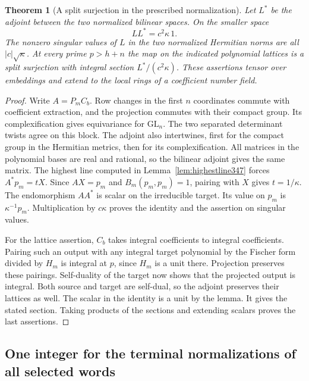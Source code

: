\documentclass[a4paper,11pt]{article}
\newtheorem{theorem}[proposition]{Theorem}
\theoremstyle{definition}
\theoremstyle{remark}
\numberwithin{equation}{section}
\begin{document}
\begin{theorem}[A split surjection in the prescribed normalization]\leavevmode
\label{thm:lowerlattice347}
Let \(L^*\) be the adjoint between the two normalized bilinear
spaces. On the smaller space
\[
                 LL^*=c^2\kappa\,1 .
\]
The nonzero singular values of \(L\) in the two normalized
Hermitian norms are all \(|c|\sqrt{\kappa}\).
At every prime \(p>h+n\) the map on the indicated polynomial
lattices is a split surjection with integral section
\(L^*/(c^2\kappa)\). These assertions tensor over embeddings
and extend to the local rings of a coefficient number field.
\end{theorem}
\begin{proof}
Write \(A=P_m C_b\). Row changes in the first \(n\) coordinates
commute with coefficient extraction, and the projection commutes
with their compact group. Its complexification gives equivariance
for \(\mathrm{GL}_n\). The two separated determinant twists agree
on this block. The adjoint also intertwines, first for the compact
group in the Hermitian metrics, then for its complexification.
All matrices in the polynomial bases are real and rational, so
the bilinear adjoint gives the same matrix. The highest line
computed in Lemma~\ref{lem:highestline347} forces
\(A^*p_m=tX\). Since \(AX=p_m\) and \(B_m(p_m,p_m)=1\),
pairing with \(X\) gives \(t=1/\kappa\).
The endomorphism \(AA^*\) is scalar on the irreducible target.
Its value on \(p_m\) is \(\kappa^{-1}p_m\).
Multiplication by \(c\kappa\) proves the identity and the
assertion on singular values.

For the lattice assertion, \(C_b\) takes integral coefficients
to integral coefficients. Pairing such an output with any integral
target polynomial by the Fischer form divided by \(H_m\) is
integral at \(p\), since \(H_m\) is a unit there. Projection
preserves these pairings. Self-duality of the target now shows
that the projected output is integral. Both source and target
are self-dual, so the adjoint preserves their lattices as well.
The scalar in the identity is a unit by the lemma. It gives the
stated section. Taking products of the sections and extending
scalars proves the last assertions.
\end{proof}


\subsection{One integer for the terminal normalizations of all selected words}\label{sec:wordlower348}
\end{document}
